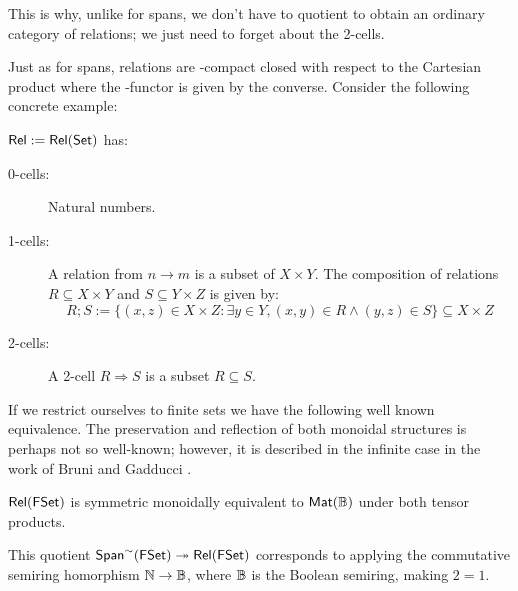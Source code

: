 This is why, unlike for spans,  we don't have to quotient to obtain an ordinary category of relations; we just need to forget about the 2-cells.

Just as for spans, relations are \dag-compact closed with respect to the Cartesian product where the \dag-functor is given by the converse.
Consider the following concrete example:
\begin{example}
$\mathsf{Rel}:=\mathsf{Rel}(\mathsf{Set})$ has:
\begin{description}
\item[0-cells:] Natural numbers.
\item[1-cells:] A relation from $n\to m$ is a subset of $X \times Y$.
The composition of relations $R \subseteq X \times Y$  and $S \subseteq Y \times Z$ is given by:
$$
R;S := \{  (x,z) \in X\times Z: \exists y \in Y, (x,y) \in R \wedge (y,z) \in S \} \subseteq X\times Z
$$ 
\item[2-cells:] 
A 2-cell $R\Rightarrow S$ is a subset $R\subseteq S$.
\end{description}
\end{example}
If we restrict ourselves to finite sets we have the following well known equivalence.  The preservation and reflection of both monoidal structures is perhaps not so well-known; however, it is described in the infinite case in the work of Bruni and Gadducci \cite[\S 3]{bruni}.
\begin{lemma}
$\mathsf{Rel}(\mathsf{FSet})$ is symmetric monoidally equivalent to $\mathsf{Mat}(\mathbb{B})$ under both tensor products. 
\end{lemma}
This quotient $\mathsf{Span}^{\sim}(\mathsf{FSet})\twoheadrightarrow \mathsf{Rel}(\mathsf{FSet})$ corresponds to applying the commutative semiring homorphism $\mathbb{N}\to \mathbb{B}$, where $\mathbb{B}$ is the Boolean semiring, making $2=1$.

